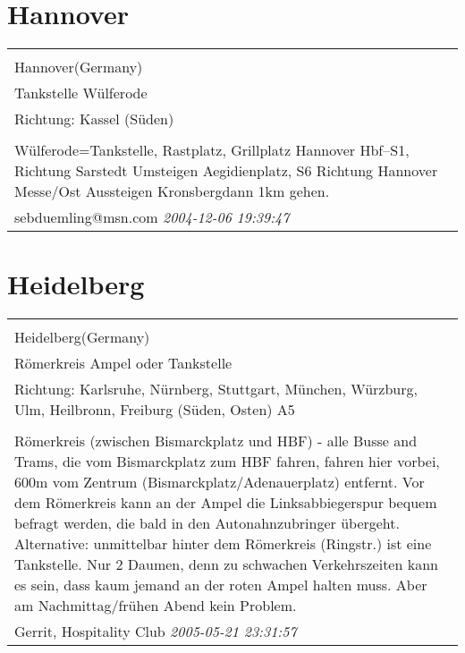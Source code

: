\documentclass[a4paper,12pt]{article}
\begin{document}
\section{Hannover}
\begin{tabular}{|p{13cm}|}
\hline\\
Hannover(Germany)\\
Tankstelle Wülferode\\
Richtung: Kassel (Süden) \\
\hline\\
Wülferode=Tankstelle, Rastplatz, Grillplatz Hannover Hbf--S1, Richtung Sarstedt Umsteigen Aegidienplatz, S6 Richtung Hannover Messe/Ost Aussteigen Kronsbergdann 1km gehen. \\
sebduemling@msn.com \textit{ 2004-12-06 19:39:47 }\\\hline
\end{tabular}


\section{Heidelberg}
\begin{tabular}{|p{13cm}|}
\hline\\
Heidelberg(Germany)\\
Römerkreis Ampel oder Tankstelle\\
Richtung: Karlsruhe, Nürnberg, Stuttgart, München, Würzburg, Ulm, Heilbronn, Freiburg (Süden, Osten) A5 \\
\hline\\
Römerkreis (zwischen Bismarckplatz und HBF) - alle Busse and Trams, die vom Bismarckplatz zum HBF fahren, fahren hier vorbei, 600m vom Zentrum (Bismarckplatz/Adenauerplatz) entfernt. Vor dem Römerkreis kann an der Ampel die Linksabbiegerspur bequem befragt werden, die bald in den Autonahnzubringer übergeht.
Alternative: unmittelbar hinter dem Römerkreis (Ringstr.) ist eine Tankstelle.
Nur 2 Daumen, denn zu schwachen Verkehrszeiten kann es sein, dass kaum jemand an der roten Ampel halten muss. Aber am Nachmittag/frühen Abend kein Problem. \\
Gerrit, Hospitality Club \textit{ 2005-05-21 23:31:57 }\\\hline
\end{tabular}
\end{document}
